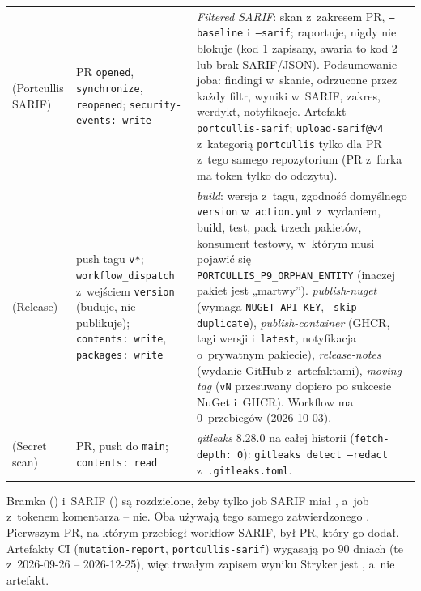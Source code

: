 \begin{xltabular}{\linewidth}{@{}>{\raggedright\arraybackslash}p{3.1cm} >{\raggedright\arraybackslash}p{3.3cm} >{\raggedright\arraybackslash}X@{}}
 (Portcullis SARIF) & PR \texttt{opened}, \texttt{synchronize}, \texttt{reopened}; \texttt{security-events: write} & \emph{Filtered SARIF}: skan z~zakresem PR, \texttt{--baseline} i~\texttt{--sarif}; raportuje, nigdy nie blokuje (kod 1 zapisany, awaria to kod 2 lub brak SARIF/JSON). Podsumowanie joba: findingi w~skanie, odrzucone przez każdy filtr, wyniki w~SARIF, zakres, werdykt, notyfikacje. Artefakt \texttt{portcullis-sarif}; \texttt{upload-sarif@v4} z~kategorią \texttt{portcullis} tylko dla PR z~tego samego repozytorium (PR z~forka ma token tylko do odczytu). \\
 (Release) & push tagu \texttt{v*}; \texttt{workflow\_dispatch} z~wejściem \texttt{version} (buduje, nie publikuje); \texttt{contents: write}, \texttt{packages: write} & \emph{build}: wersja z~tagu, zgodność domyślnego \texttt{version} w~\texttt{action.yml} z~wydaniem, build, test, pack trzech pakietów, konsument testowy, w~którym musi pojawić się \texttt{PORTCULLIS\_P9\_ORPHAN\_ENTITY} (inaczej pakiet jest „martwy”). \emph{publish-nuget} (wymaga \texttt{NUGET\_API\_KEY}, \texttt{--skip-duplicate}), \emph{publish-container} (GHCR, tagi wersji i~\texttt{latest}, notyfikacja o~prywatnym pakiecie), \emph{release-notes} (wydanie GitHub z~artefaktami), \emph{moving-tag} (\texttt{vN} przesuwany dopiero po sukcesie NuGet i~GHCR). Workflow ma 0~przebiegów (2026-10-03). \\
 (Secret scan) & PR, push do \texttt{main}; \texttt{contents: read} & \emph{gitleaks} 8.28.0 na całej historii (\texttt{fetch-depth: 0}): \texttt{gitleaks detect --redact} z~\texttt{.gitleaks.toml}. \\
\bottomrule
\end{xltabular}
\endgroup

Bramka () i~SARIF () są
rozdzielone, żeby tylko job SARIF miał , a~job z~tokenem
komentarza -- nie. Oba używają tego samego zatwierdzonego .
Pierwszym PR, na którym przebiegł workflow SARIF, był PR, który go dodał. Artefakty CI
(\texttt{mutation-report}, \texttt{portcullis-sarif}) wygasają po 90 dniach (te z~2026-09-26
-- 2026-12-25), więc trwałym zapisem wyniku Stryker jest , a~nie
artefakt.

